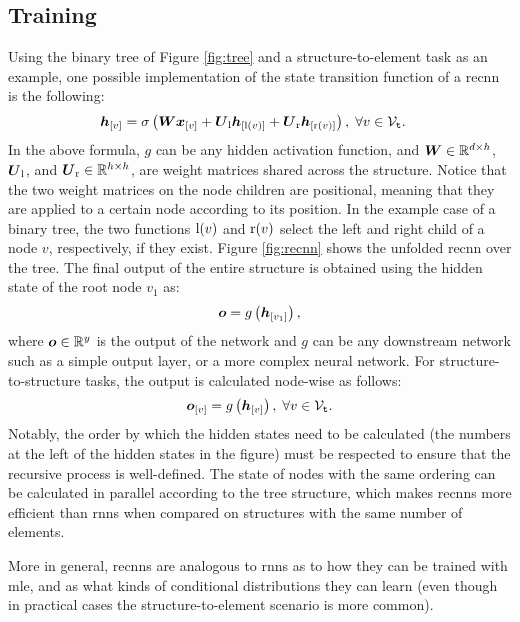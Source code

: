 \subsection{Training}
Using the binary tree of Figure \ref{fig:tree} and a structure-to-element task as an example, one possible implementation of the state transition function of a \gls{recnn} is the following:
\begin{align*}
    \Elem{h}{v} &= \sigma\Par{\Matrix{W}\Elem{x}{v} + \Matrix{U}_\Fun{l}\Elem{h}{\Fun{l}(v)} + \Matrix{U}_\Fun{r}\Elem{h}{\Fun{r}(v)}},\; \forall v \in \Nodes{t}.
\end{align*}
In the above formula, $g$ can be any hidden activation function, and $\Matrix{w} \in \Real^{d \times h}$, $\Matrix{u}_\Fun{l}$, and $\Matrix{u}_\Fun{r} \in \Real^{h \times h}$, are weight matrices shared across the structure. Notice that the two weight matrices on the node children are positional, meaning that they are applied to a certain node according to its position. In the example case of a binary tree, the two functions $\mathrm{l}(v)$ and $\mathrm{r}(v)$ select the left and right child of a node $v$, respectively, if they exist. Figure \ref{fig:recnn} shows the unfolded \gls{recnn} over the tree. The final output of the entire structure is obtained using the hidden state of the root node $v_1$ as:
$$\Vector{o} = g\Par{\Elem{h}{v_1}},$$
where $\Vector{o} \in \Real^y$ is the output of the network and $g$ can be any downstream network such as a simple output layer, or a more complex neural network. For structure-to-structure tasks, the output is calculated node-wise as follows:
$$\Elem{o}{v} = g\Par{\Elem{h}{v}},\; \forall v \in \Nodes{t}.$$
Notably, the order by which the hidden states need to be calculated (the numbers at the left of the hidden states in the figure) must be respected to ensure that the recursive process is well-defined. The state of nodes with the same ordering can be calculated in parallel according to the tree structure, which makes \glspl{recnn} more efficient than \glspl{rnn} when compared on structures with the same number of elements.
\begin{figure*}[h!]
    \centering
    \resizebox{.5\textwidth}{!}{}
    \caption{A recursive neural network unfolded over the tree of Figure \ref{fig:tree} for a structure-to-element task. The number at the left of the hidden states indicates the order in which they are calculated. Notice the initialization of the hidden states at the leaves (indicated by dashed boxes).}
    \label{fig:recnn}
\end{figure*}
More in general, \glspl{recnn} are analogous to \glspl{rnn} as to how they can be trained with \gls{mle}, and as what kinds of conditional distributions they can learn (even though in practical cases the structure-to-element scenario is more common).


